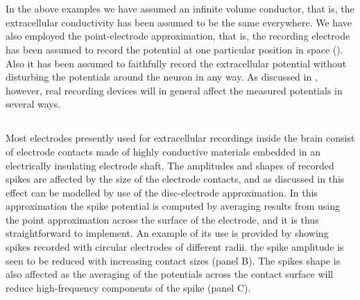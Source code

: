 \section{}
In the above examples we have assumed an infinite volume conductor, that is, the extracellular conductivity has been assumed to be the same everywhere. We have also employed the point-electrode approximation, that is, the recording electrode has been assumed  to record the potential at one particular position in space (). Also it has been assumed to faithfully record the extracellular potential without disturbing the potentials around the neuron in any way.  As discussed in , however, real recording devices will in general affect the measured potentials in several ways.  

\subsection{}
\label{sec:Spikes:electrode_size}
Most electrodes presently used for extracellular recordings inside the brain consist of electrode contacts made of
highly conductive materials embedded in an electrically insulating electrode shaft. The amplitudes and shapes of 
recorded spikes are affected by the size of the electrode contacts, and as discussed in 
this effect can be modelled by use of the disc-electrode approximation. In this approximation the spike potential is computed
by averaging results from using the point approximation across the surface of the electrode, and it is thus straightforward to implement. An example of its use is provided by  showing spikes recorded with circular electrodes of different radii.  the spike amplitude is seen to be reduced with increasing contact sizes (panel B). The spikes shape is also affected as the averaging of the potentials across the contact surface will reduce high-frequency components of the spike (panel C).

